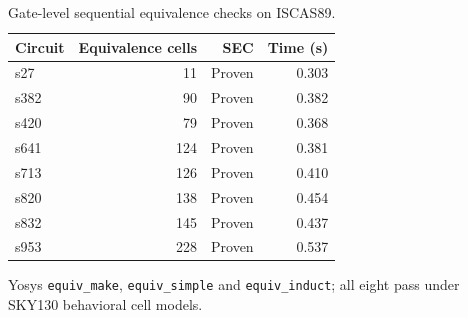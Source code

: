 \begin{table}[htbp]\centering\small
\caption{Gate-level sequential equivalence checks on ISCAS89.}\label{tab:sec_iscas8}
\begin{tabular}{lrrr}\toprule
Circuit & Equivalence cells & SEC & Time (s)\\\midrule
s27 & 11 & Proven & 0.303\\
s382 & 90 & Proven & 0.382\\
s420 & 79 & Proven & 0.368\\
s641 & 124 & Proven & 0.381\\
s713 & 126 & Proven & 0.410\\
s820 & 138 & Proven & 0.454\\
s832 & 145 & Proven & 0.437\\
s953 & 228 & Proven & 0.537\\\bottomrule
\end{tabular}
\par\smallskip\footnotesize Yosys \texttt{equiv\_make}, \texttt{equiv\_simple} and \texttt{equiv\_induct}; all eight pass under SKY130 behavioral cell models.
\end{table}
